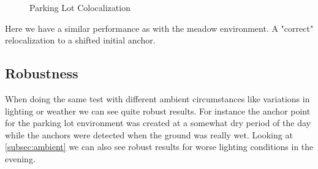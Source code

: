 \begin{figure}[htp]
    \centering
        \hfill
        \hfill
    \caption{Parking Lot Colocalization}
    \label{fig:parking_lot_basic}
\end{figure}

Here we have a similar performance as with the meadow environment. A "correct" relocalization to a shifted initial anchor. 

\subsection{Robustness}\label{subsec:robustness}

When doing the same test with different ambient circumstances like variations in lighting or weather we can see quite robust results. For instance the anchor point for the parking lot environment was created at a somewhat dry period of the day while the anchors were detected when the ground was really wet. Looking at \cref{subsec:ambient} we can also see robust results for worse lighting conditions in the evening.

